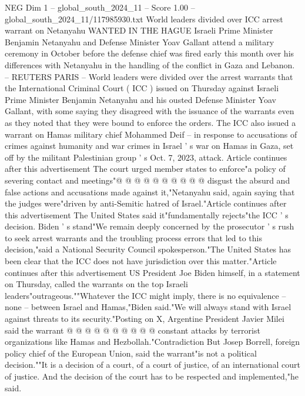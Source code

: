 \begin{textsample}{NEG Dim 1 – global\_south\_2024\_11 – Score 1.00 – global\_south\_2024\_11/117985930.txt}  \label{ex:f1_neg_203}
World leaders divided over ICC arrest warrant on Netanyahu WANTED IN THE HAGUE Israeli Prime Minister Benjamin Netanyahu and Defense Minister Yoav Gallant attend a military ceremony in October before the defense chief was fired early this month over his differences with Netanyahu in the handling of the conflict in Gaza and Lebanon. -- REUTERS PARIS -- World leaders were divided over the arrest warrants that the International Criminal Court ( ICC ) issued on Thursday against Israeli Prime Minister Benjamin Netanyahu and his ousted Defense Minister Yoav Gallant, with some saying they disagreed with the issuance of the warrants even as they noted that they were bound to enforce the orders.
The ICC also issued a warrant on Hamas military chief Mohammed Deif -- in response to accusations of crimes against humanity and war crimes in Israel ' s war on Hamas in Gaza, set off by the militant Palestinian group ' s Oct. 7, 2023, attack.
Article continues after this advertisement The court urged member states to enforce"a policy of severing contact and meetings"@ @ @ @ @ @ @ @ @ @ disgust the absurd and false actions and accusations made against it,"Netanyahu said, again saying that the judges were"driven by anti-Semitic hatred of Israel."Article continues after this advertisement The United States said it"fundamentally rejects"the ICC ' s decision.
Biden ' s stand"We remain deeply concerned by the prosecutor ' s rush to seek arrest warrants and the troubling process errors that led to this decision,"said a National Security Council spokesperson."The United States has been clear that the ICC does not have jurisdiction over this matter."Article continues after this advertisement US President Joe Biden himself, in a statement on Thursday, called the warrants on the top Israeli leaders"outrageous.""Whatever the ICC might imply, there is no equivalence -- none -- between Israel and Hamas,"Biden said."We will always stand with Israel against threats to its security."Posting on X, Argentine President Javier Milei said the warrant @ @ @ @ @ @ @ @ @ @ constant attacks by terrorist organizations like Hamas and Hezbollah."Contradiction But Josep Borrell, foreign policy chief of the European Union, said the warrant"is not a political decision.""It is a decision of a court, of a court of justice, of an international court of justice.
And the decision of the court has to be respected and implemented,"he said.

\end{textsample}
